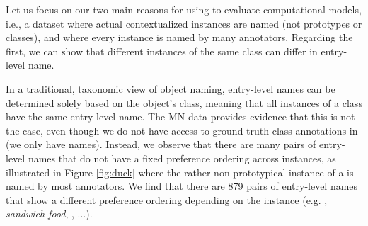 Let us focus on our two main reasons for using \mn to evaluate computational models, i.e., a dataset where actual contextualized instances are named (not prototypes or classes), and where every instance is named by many annotators.
Regarding the first, we can show that different instances of the same class can differ in entry-level name.

In a traditional, taxonomic view of object naming, entry-level names can be determined solely based on the object's class, meaning that all instances of a class have the same entry-level name. The MN data provides evidence that this is not the case, even though we do not have access to ground-truth class annotations in \vg (we only have names). Instead, we observe that there are many pairs of entry-level names that do not have a fixed preference ordering across instances, as illustrated in Figure \ref{fig:duck} where the rather non-prototypical instance of a  is named  by most annotators. We find that there are 879 pairs of entry-level names that show a different preference ordering depending on the instance (e.g. , \textit{sandwich-food}, , ...).

